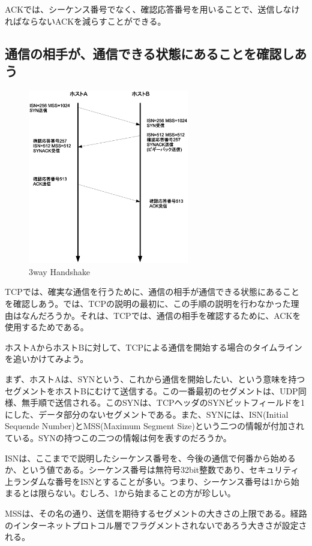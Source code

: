 ACKでは、シーケンス番号でなく、確認応答番号を用いることで、送信しなければならないACKを減らすことができる。

\subsection{通信の相手が、通信できる状態にあることを確認しあう}
\begin{figure}
	\includegraphics[width=7cm, clip]{draw/tcp04n.eps}
	\caption{3way Handshake}
	\label{fig:tcp04}
\end{figure}


TCPでは、確実な通信を行うために、通信の相手が通信できる状態にあることを確認しあう。では、TCPの説明の最初に、この手順の説明を行わなかった理由はなんだろうか。それは、TCPでは、通信の相手を確認するために、ACKを使用するためである。

ホストAからホストBに対して、TCPによる通信を開始する場合のタイムラインを追いかけてみよう。

まず、ホストAは、SYNという、これから通信を開始したい、という意味を持つセグメントをホストBにむけて送信する。この一番最初のセグメントは、UDP同様、無手順で送信される。このSYNは、TCPヘッダのSYNビットフィールドを1にした、データ部分のないセグメントである。また、SYNには、ISN(Initial Sequende Number)とMSS(Maximum Segment Size)という二つの情報が付加されている。SYNの持つこの二つの情報は何を表すのだろうか。



ISNは、ここまでで説明したシーケンス番号を、今後の通信で何番から始めるか、という値である。シーケンス番号は無符号32bit整数であり、セキュリティ上ランダムな番号をISNとすることが多い。つまり、シーケンス番号は1から始まるとは限らない。むしろ、1から始まることの方が珍しい。

MSSは、その名の通り、送信を期待するセグメントの大きさの上限である。経路のインターネットプロトコル層でフラグメントされないであろう大きさが設定される。

